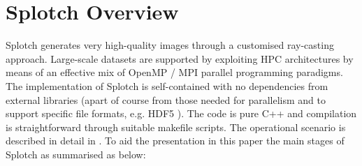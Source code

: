 \documentclass[11pt]{article}
\begin{document}
\section{Splotch Overview}
\label{sec:overview}

Splotch generates very high-quality images through a customised ray-casting approach. Large-scale datasets are supported by exploiting HPC architectures by means of an effective mix of OpenMP / MPI parallel programming paradigms.  
The implementation of Splotch is self-contained with no dependencies from external libraries (apart of course from those needed for parallelism and to support specific file formats, e.g. HDF5 \cite{hdf5}). The code is pure C++ and compilation is straightforward through suitable makefile scripts. The operational scenario is described in detail in \cite{2008NJPh...10l5006D}. To aid the presentation in this paper the main stages of Splotch as summarised as below:
\end{document}
